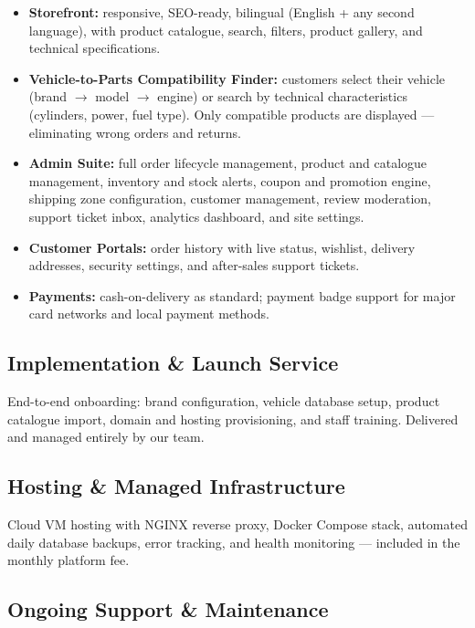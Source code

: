 \documentclass[11pt,a4paper]{article}
\begin{document}
\begin{itemize}[leftmargin=1.4em,itemsep=3pt]
  \item \textbf{Storefront:} responsive, SEO-ready, bilingual (English
        + any second language), with product catalogue, search, filters,
        product gallery, and technical specifications.
  \item \textbf{Vehicle-to-Parts Compatibility Finder:} customers
        select their vehicle (brand $\rightarrow$ model $\rightarrow$
        engine) or search by technical characteristics (cylinders,
        power, fuel type). Only compatible products are displayed ---
        eliminating wrong orders and returns.
  \item \textbf{Admin Suite:} full order lifecycle management, product
        and catalogue management, inventory and stock alerts, coupon
        and promotion engine, shipping zone configuration, customer
        management, review moderation, support ticket inbox, analytics
        dashboard, and site settings.
  \item \textbf{Customer Portals:} order history with live status,
        wishlist, delivery addresses, security settings, and
        after-sales support tickets.
  \item \textbf{Payments:} cash-on-delivery as standard; payment badge
        support for major card networks and local payment methods.
\end{itemize}

\subsection{Implementation \& Launch Service}

End-to-end onboarding: brand configuration, vehicle database setup,
product catalogue import, domain and hosting provisioning, and staff
training. Delivered and managed entirely by our team.

\subsection{Hosting \& Managed Infrastructure}

Cloud VM hosting with NGINX reverse proxy, Docker Compose stack,
automated daily database backups, error tracking, and health
monitoring --- included in the monthly platform fee.

\subsection{Ongoing Support \& Maintenance}
\end{document}
